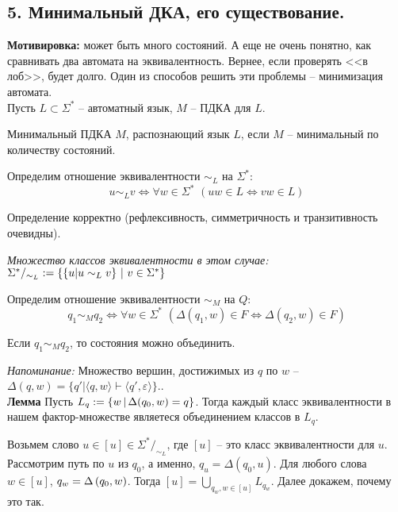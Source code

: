 \subsection{5. Минимальный ДКА, его существование.}

\textbf{Мотивировка:} может быть много состояний. А еще не очень понятно, как сравнивать два автомата на эквивалентность. Вернее, если проверять <<в лоб>>, будет долго. Один из способов решить эти проблемы -- минимизация автомата.\\

Пусть $L \subset \Sigma^*$ -- автоматный язык, $M$ -- ПДКА для $L$.

\Def Минимальный ПДКА $M$, распознающий язык $L$, если $M$ -- минимальный по количеству состояний.

\hspace{4ex}

\Def Определим отношение эквивалентности $\sim_L$ на $\Sigma^*:$
$$u \sim_L v \Longleftrightarrow \forall w \in \Sigma^* \,\,(uw \in L \Longleftrightarrow vw \in L)$$

Определение корректно (рефлексивность, симметричность и транзитивность очевидны).

\textit{Множество классов эквивалентности в этом случае:} 
$\Sigma^* /_{\sim_L}:= \{\{u \arrowvert u \sim_L v\} \,\,\arrowvert\,\, v \in \Sigma^*\}$

\Def Определим отношение эквивалентности $\sim_M$ на $Q:$
$$q_1 \sim_M q_2 \Longleftrightarrow \forall w \in \Sigma^*\,\,(\Delta(q_1, w) \in F \Longleftrightarrow \Delta(q_2, w) \in F)$$

Если $q_1 \sim_M q_2$, то состояния можно объединить.

\textit{Напоминание:} Множество вершин, достижимых из $q$ по $w$ -- $\Delta (q, w) = \{ q' | \langle q, w \rangle \vdash \langle q', \varepsilon \rangle \}$..\\

\textbf{Лемма}
Пусть $L_q := \{w \,\arrowvert\, \Delta(q_0, w) = q\}$. Тогда каждый класс эквивалентности в нашем фактор-множестве являетеся объединением классов в $L_q$.

\Proof
Возьмем слово $u \in [u] \in \Sigma^*/_{\sim_L}$, где $[u]$ -- это класс эквивалентности для $u$. Рассмотрим путь по $u$ из $q_0$, а именно,  $q_u = \Delta(q_0, u)$. Для любого слова $w \in [u]$, $q_w = \Delta \left({q_0, w}\right)$. Тогда $[u] = \bigcup \limits_{q_w, w \in [u]} L_{q_w}$. Далее докажем, почему это так.

